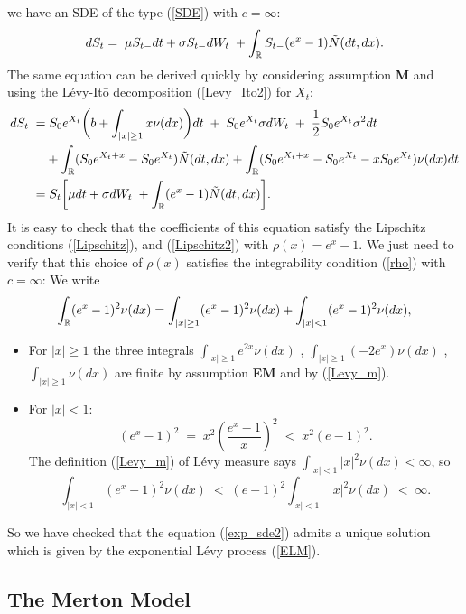 we have an SDE of the type (\ref{SDE}) with $c=\infty$: 
\begin{equation}\label{exp_sde2}
 d S_t = \; \mu S_{t-} dt +  \sigma S_{t-} dW_t \; + \int_{\mathbb{R}} S_{t-} (e^{x} - 1) \tilde N(dt,dx). 
\end{equation}
The same equation can be derived quickly by considering assumption \textbf{M} and using the  
Lévy-It\={o} decomposition (\ref{Levy_Ito2}) for $X_t$:
\begin{align*}
 d S_t \; =& \; S_0 e^{X_{t}} \biggl( b + \int_{|x|\geq 1}x \nu(dx) \biggr) dt \; + \; S_0 e^{X_{t}} \sigma dW_t \; + \; \frac{1}{2}S_0 e^{X_{t}}\sigma^2 dt \\ \nonumber
          &+ \int_{\mathbb{R}} (S_0 e^{X_{t}+x} - S_0 e^{X_{t}}) \tilde N(dt,dx) + \int_{\mathbb{R}} (S_0 e^{X_{t}+x} - S_0 e^{X_{t}} - x S_0 e^{X_{t}}) \nu(dx) dt \\ \nonumber
          =& \; S_t \biggl[ \mu dt +  \sigma dW_t \; + \int_{\mathbb{R}} (e^{x} - 1) \tilde N(dt,dx) \biggr].\\
\end{align*}
It is easy to check that the coefficients of this equation satisfy the Lipschitz conditions (\ref{Lipschitz}), and 
(\ref{Lipschitz2}) with $\rho(x) = e^x-1$.
We just need to verify that this choice of $\rho(x)$ satisfies the integrability condition (\ref{rho}) with $c=\infty$:
We write $$ \int_{\mathbb{R}} (e^x-1)^2 \nu(dx) = \int_{|x|\geq1} (e^x-1)^2 \nu(dx) + \int_{|x| < 1} (e^x-1)^2 \nu(dx),$$
 \begin{itemize}
  \item For $|x|\geq 1$ the three integrals $\int_{|x|\geq1} e^{2x} \nu(dx)$ , $\int_{|x|\geq1} (-2e^x) \nu(dx)$ ,
  $\int_{|x|\geq1} \nu(dx)$ are finite by assumption \textbf{EM} and by (\ref{Levy_m}).
  \item For $|x| < 1$: 
  $$(e^x-1)^2 \; = \; x^2 \left(\frac{e^x-1}{x}\right)^2 \; < \; x^2 (e-1)^2. $$ 
The definition (\ref{Levy_m}) of Lévy measure says $ \int_{|x|<1} |x|^2 \nu(dx) < \infty $, so
$$ \int_{|x|<1} (e^x-1)^2 \nu(dx) \; < \; (e-1)^2 \int_{|x|<1} |x|^2 \nu(dx) \; < \; \infty. $$  
 \end{itemize}
So we have checked that the equation (\ref{exp_sde2}) admits a unique solution which is given by the exponential 
Lévy process (\ref{ELM}).

\subsection{The Merton Model}\label{Merton_section}

